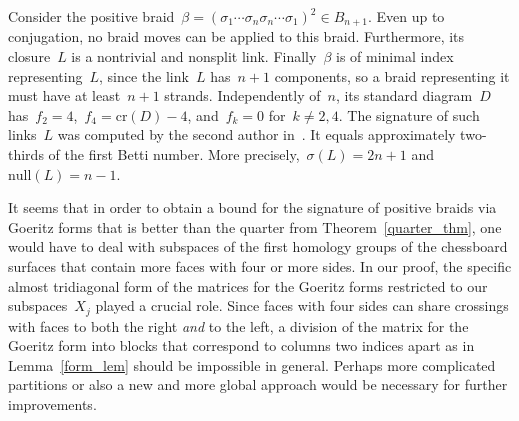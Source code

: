 \documentclass[AHL,Unicode,longabstracts,published]{cedram}
\newcommand{\rcr}{\mathrm{cr}}
\newcommand{\rnull}{\mathrm{null}}
\begin{document}
\begin{exam}\label{foursides_example}
Consider the positive braid~$\beta = (\sigma_1 \cdots \sigma_n\sigma_n \cdots \sigma_1)^2 \in B_{n+1}$. Even up to conjugation, no braid moves can be applied to this braid. Furthermore, its closure~$L$ is a nontrivial and nonsplit link. Finally~$\beta$ is of minimal index representing~$L$, since the link~$L$ has~$n+1$ components, so a braid representing it must have at least~$n+1$ strands. Independently of~$n$, its standard diagram~$D$ has~$f_2 = 4$,~$f_4 = \rcr (D)-4$, and~$f_k = 0$ for~$k \ne 2,4$. The signature of such links~$L$ was computed by the second author in~\cite[Remark~15]{Lie20}. It equals approximately two-thirds of the first Betti number. More precisely,~$\sigma(L) = 2n+1$ and~$\rnull (L) = n-1$.
\end{exam}

It seems that in order to obtain a bound for the signature of positive braids via Goeritz forms that is better than the quarter from Theorem~\ref{quarter_thm}, one would have to deal with subspaces of the first homology groups of the chessboard surfaces that contain more faces with four or more sides. In our proof, the specific almost tridiagonal form of the matrices for the Goeritz forms restricted to our subspaces~$X_j$ played a crucial role. Since faces with four sides can share crossings with faces to both the right \emph{and} to the left, a division of the matrix for the Goeritz form into blocks that correspond to columns two indices apart as in Lemma~\ref{form_lem} should be impossible in general. Perhaps more complicated partitions or also a new and more global approach would be necessary for further improvements.



\end{document}
